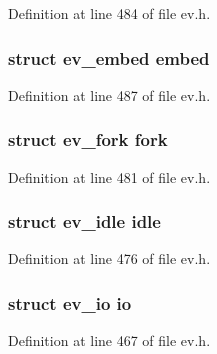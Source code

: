 \-Definition at line 484 of file ev.\-h.

\hypertarget{unionev__any__watcher_abe8c0d216686c4c099394502acff8303}{
\subsubsection[{embed}]{\setlength{\rightskip}{0pt plus 5cm}struct {\bf ev\-\_\-embed} {\bf embed}}}\label{unionev__any__watcher_abe8c0d216686c4c099394502acff8303}


\-Definition at line 487 of file ev.\-h.

\hypertarget{unionev__any__watcher_ab915eaa6312f56672c8ca4cb1692e87c}{
\subsubsection[{fork}]{\setlength{\rightskip}{0pt plus 5cm}struct {\bf ev\-\_\-fork} {\bf fork}}}\label{unionev__any__watcher_ab915eaa6312f56672c8ca4cb1692e87c}


\-Definition at line 481 of file ev.\-h.

\hypertarget{unionev__any__watcher_a873722b2eacfc6fdbf2cccbf3a3d90b9}{
\subsubsection[{idle}]{\setlength{\rightskip}{0pt plus 5cm}struct {\bf ev\-\_\-idle} {\bf idle}}}\label{unionev__any__watcher_a873722b2eacfc6fdbf2cccbf3a3d90b9}


\-Definition at line 476 of file ev.\-h.

\hypertarget{unionev__any__watcher_a8a4fa321488e67a96ad783dc24187c4c}{
\subsubsection[{io}]{\setlength{\rightskip}{0pt plus 5cm}struct {\bf ev\-\_\-io} {\bf io}}}\label{unionev__any__watcher_a8a4fa321488e67a96ad783dc24187c4c}


\-Definition at line 467 of file ev.\-h.

